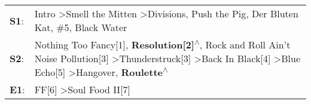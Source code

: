 \begin{supertabular}{p{0.03\textwidth}p{0.92\textwidth}}
 \textbf{S1}:  &                                                                                                                                                      Intro\textsuperscript{} \textgreater \enspace Smell the Mitten\textsuperscript{} \textgreater \enspace Divisions\textsuperscript{}, \enspace Push the Pig\textsuperscript{}, \enspace Der Bluten Kat\textsuperscript{}, \enspace \#5\textsuperscript{}, \enspace Black Water\textsuperscript{}  \enspace  \\
 \textbf{S2}:  &  Nothing Too Fancy[1]\textsuperscript{}, \enspace \textbf{Resolution[2]\textsuperscript{$\wedge$}}, \enspace Rock and Roll Ain't Noise Pollution[3]\textsuperscript{} \textgreater \enspace Thunderstruck[3]\textsuperscript{} \textgreater \enspace Back In Black[4]\textsuperscript{} \textgreater \enspace Blue Echo[5]\textsuperscript{} \textgreater \enspace Hangover\textsuperscript{}, \enspace \textbf{Roulette\textsuperscript{$\wedge$}}  \enspace  \\
 \textbf{E1}:  &                                                                                                                                                                                                                                                                                                                                                                     FF[6]\textsuperscript{} \textgreater \enspace Soul Food II[7]\textsuperscript{}  \enspace  \\
\end{supertabular}
